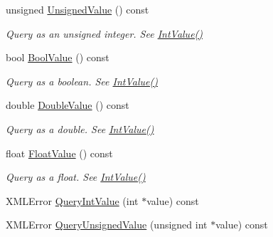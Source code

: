 \begin{DoxyCompactItemize}
\item 
\hypertarget{classtinyxml2_1_1_x_m_l_attribute_a4c7a179907836a136d1ce5acbe53389d}{}unsigned \hyperlink{classtinyxml2_1_1_x_m_l_attribute_a4c7a179907836a136d1ce5acbe53389d}{Unsigned\+Value} () const \label{classtinyxml2_1_1_x_m_l_attribute_a4c7a179907836a136d1ce5acbe53389d}

\begin{DoxyCompactList}\small\item\em Query as an unsigned integer. See \hyperlink{classtinyxml2_1_1_x_m_l_attribute_a949d02a5888092cc68c1e29185301863}{Int\+Value()} \end{DoxyCompactList}\item 
\hypertarget{classtinyxml2_1_1_x_m_l_attribute_afb444b7a12527f836aa161b54b2f7ce7}{}bool \hyperlink{classtinyxml2_1_1_x_m_l_attribute_afb444b7a12527f836aa161b54b2f7ce7}{Bool\+Value} () const \label{classtinyxml2_1_1_x_m_l_attribute_afb444b7a12527f836aa161b54b2f7ce7}

\begin{DoxyCompactList}\small\item\em Query as a boolean. See \hyperlink{classtinyxml2_1_1_x_m_l_attribute_a949d02a5888092cc68c1e29185301863}{Int\+Value()} \end{DoxyCompactList}\item 
\hypertarget{classtinyxml2_1_1_x_m_l_attribute_a336153e5aa1b7ccd6502fc249bfb3fd7}{}double \hyperlink{classtinyxml2_1_1_x_m_l_attribute_a336153e5aa1b7ccd6502fc249bfb3fd7}{Double\+Value} () const \label{classtinyxml2_1_1_x_m_l_attribute_a336153e5aa1b7ccd6502fc249bfb3fd7}

\begin{DoxyCompactList}\small\item\em Query as a double. See \hyperlink{classtinyxml2_1_1_x_m_l_attribute_a949d02a5888092cc68c1e29185301863}{Int\+Value()} \end{DoxyCompactList}\item 
\hypertarget{classtinyxml2_1_1_x_m_l_attribute_ae3d51ff98eacc1dc46efcfdaee5c84ad}{}float \hyperlink{classtinyxml2_1_1_x_m_l_attribute_ae3d51ff98eacc1dc46efcfdaee5c84ad}{Float\+Value} () const \label{classtinyxml2_1_1_x_m_l_attribute_ae3d51ff98eacc1dc46efcfdaee5c84ad}

\begin{DoxyCompactList}\small\item\em Query as a float. See \hyperlink{classtinyxml2_1_1_x_m_l_attribute_a949d02a5888092cc68c1e29185301863}{Int\+Value()} \end{DoxyCompactList}\item 
X\+M\+L\+Error \hyperlink{classtinyxml2_1_1_x_m_l_attribute_ad510a83c4ff2755844bb250b125d28ff}{Query\+Int\+Value} (int $\ast$value) const 
\item 
\hypertarget{classtinyxml2_1_1_x_m_l_attribute_ac93f5981adfd62ac4ea76bfa668ee2b4}{}X\+M\+L\+Error \hyperlink{classtinyxml2_1_1_x_m_l_attribute_ac93f5981adfd62ac4ea76bfa668ee2b4}{Query\+Unsigned\+Value} (unsigned int $\ast$value) const \label{classtinyxml2_1_1_x_m_l_attribute_ac93f5981adfd62ac4ea76bfa668ee2b4}


\end{DoxyCompactItemize}
